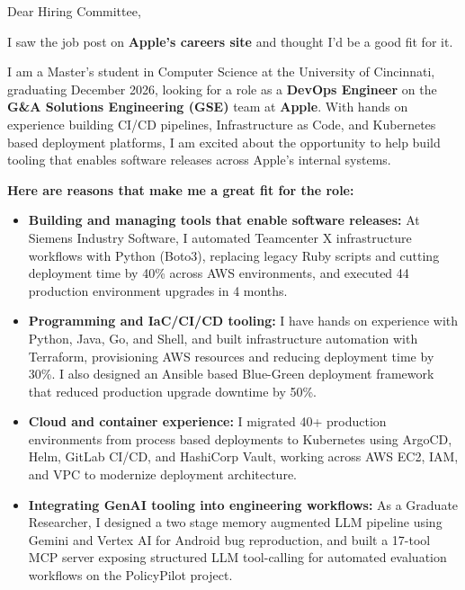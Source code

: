 \documentclass[11pt]{letter}
\date{}
\begin{document}
\begin{letter}{}

\opening{Dear Hiring Committee,}

I saw the job post on \textbf{Apple's careers site} and thought I'd be a good fit for it.

I am a Master's student in Computer Science at the University of Cincinnati, graduating December 2026, looking for a role as a \textbf{DevOps Engineer} on the \textbf{G\&A Solutions Engineering (GSE)} team at \textbf{Apple}. With hands on experience building CI/CD pipelines, Infrastructure as Code, and Kubernetes based deployment platforms, I am excited about the opportunity to help build tooling that enables software releases across Apple's internal systems.

\textbf{Here are reasons that make me a great fit for the role:}

\begin{itemize}[leftmargin=*, itemsep=0.45em]
    \item \textbf{Building and managing tools that enable software releases:} At Siemens Industry Software, I automated Teamcenter X infrastructure workflows with Python (Boto3), replacing legacy Ruby scripts and cutting deployment time by 40\% across AWS environments, and executed 44 production environment upgrades in 4 months.

    \item \textbf{Programming and IaC/CI/CD tooling:} I have hands on experience with Python, Java, Go, and Shell, and built infrastructure automation with Terraform, provisioning AWS resources and reducing deployment time by 30\%. I also designed an Ansible based Blue-Green deployment framework that reduced production upgrade downtime by 50\%.

    \item \textbf{Cloud and container experience:} I migrated 40+ production environments from process based deployments to Kubernetes using ArgoCD, Helm, GitLab CI/CD, and HashiCorp Vault, working across AWS EC2, IAM, and VPC to modernize deployment architecture.

    \item \textbf{Integrating GenAI tooling into engineering workflows:} As a Graduate Researcher, I designed a two stage memory augmented LLM pipeline using Gemini and Vertex AI for Android bug reproduction, and built a 17-tool MCP server exposing structured LLM tool-calling for automated evaluation workflows on the PolicyPilot project.


\end{itemize}
\end{letter}
\end{document}
